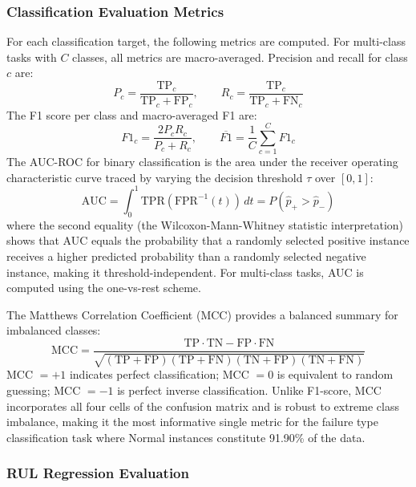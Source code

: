 \subsubsection{Classification Evaluation Metrics}

For each classification target, the following metrics are computed. For multi-class tasks with $C$ classes, all metrics are macro-averaged. Precision and recall for class $c$ are:
\begin{equation}
    P_c = \frac{\text{TP}_c}{\text{TP}_c + \text{FP}_c}, \qquad
    R_c = \frac{\text{TP}_c}{\text{TP}_c + \text{FN}_c}
    \label{eq:pr}
\end{equation}
The F1 score per class and macro-averaged F1 are:
\begin{equation}
    F1_c = \frac{2 P_c R_c}{P_c + R_c}, \qquad
    \overline{F1} = \frac{1}{C} \sum_{c=1}^{C} F1_c
    \label{eq:f1}
\end{equation}
The AUC-ROC for binary classification is the area under the receiver operating characteristic curve traced by varying the decision threshold $\tau$ over $[0,1]$:
\begin{equation}
    \text{AUC} = \int_0^1 \text{TPR}(\text{FPR}^{-1}(t))\, dt = P(\hat{p}_{+} > \hat{p}_{-})
    \label{eq:auc}
\end{equation}
where the second equality (the Wilcoxon-Mann-Whitney statistic interpretation) shows that AUC equals the probability that a randomly selected positive instance receives a higher predicted probability than a randomly selected negative instance, making it threshold-independent. For multi-class tasks, AUC is computed using the one-vs-rest scheme.

The Matthews Correlation Coefficient (MCC) provides a balanced summary for imbalanced classes:
\begin{equation}
    \text{MCC} = \frac{\text{TP} \cdot \text{TN} - \text{FP} \cdot \text{FN}}
    {\sqrt{(\text{TP}+\text{FP})(\text{TP}+\text{FN})(\text{TN}+\text{FP})(\text{TN}+\text{FN})}}
    \label{eq:mcc}
\end{equation}
MCC $= +1$ indicates perfect classification; MCC $= 0$ is equivalent to random guessing; MCC $= -1$ is perfect inverse classification. Unlike F1-score, MCC incorporates all four cells of the confusion matrix and is robust to extreme class imbalance, making it the most informative single metric for the failure type classification task where Normal instances constitute 91.90\% of the data.

\subsubsection{RUL Regression Evaluation}


